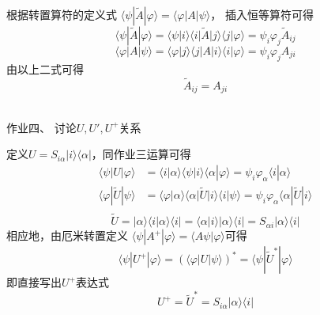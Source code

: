 \documentclass[a4paper]{article}
\begin{document}
\begin{CJK*}{UTF8}{song}
\begin{CJK*}{UTF8}{hei}
    \end{CJK*}
    {
    \indent 根据转置算符的定义式
    $\langle\psi|\widetilde{A}|\varphi\rangle=\langle\varphi|A|\psi\rangle$，
    插入恒等算符可得
    $$\langle\psi|\widetilde{A}|\varphi\rangle 
        = \langle\psi|i\rangle\langle i|\widetilde{A}|j\rangle\langle j|\varphi\rangle
        =\psi_{i}\varphi_{j}\widetilde{A}_{ij}$$
    $$\langle\varphi|A|\psi\rangle
        = \langle\varphi|j\rangle\langle j|A|i\rangle\langle i|\varphi\rangle
        =\psi_{i}\varphi_{j}A_{ji}$$
    \indent 由以上二式可得
    $$\widetilde{A}_{ij}=A_{ji}$$ 
    }\\[20pt]
    \begin{CJK*}{UTF8}{hei}
    \noindent 作业四、 讨论$U,U',U^{+}$关系\\[12pt]
    \end{CJK*}
    {
    \indent 定义$U=S_{i\alpha}|i\rangle\langle\alpha|$，同作业三运算可得\\
    \begin{equation*}\begin{split}
    \langle\psi|U|\varphi\rangle
        & =\langle i|\alpha\rangle\langle\psi|i\rangle\langle\alpha|\varphi\rangle
            =\psi_{i}\varphi_{\alpha}\langle i|\alpha\rangle\\ 
    \langle\varphi|\widetilde{U}|\psi\rangle
        & = \langle\varphi|\alpha\rangle\langle\alpha|
            \widetilde{U}|i\rangle\langle i|\psi\rangle
            =\psi_{i}\varphi_{\alpha}\langle\alpha|\widetilde{U}|i\rangle\\
    \end{split}\end{equation*}
    $$\widetilde{U}
        = |\alpha\rangle\langle i|\alpha\rangle\langle i|
        = \langle\alpha|i\rangle|\alpha\rangle\langle i|
        =S_{\alpha i}|\alpha\rangle\langle i|$$
    \indent 相应地，由厄米转置定义
        $\langle\psi|A^{+}|\varphi\rangle=\langle A\psi|\varphi\rangle$可得
    $$\langle\psi|U^{+}|\varphi\rangle = (\langle\varphi|U|\psi\rangle)^{*}
        =\langle\psi|\widetilde{U}^{*}|\varphi\rangle$$
    \indent 即直接写出$U^{+}$表达式
    $$U^{+}=\widetilde{U}^{*}=S_{i\alpha}|\alpha\rangle\langle i|$$
    }\\[20pt]
    \end{CJK*}
\end{document}
